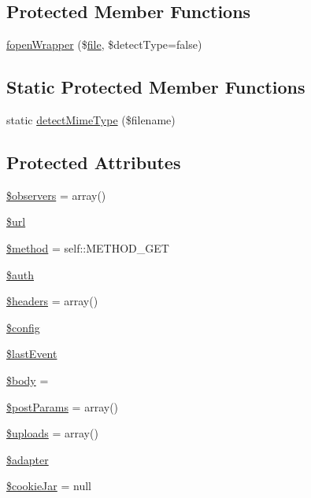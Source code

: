 \subsection*{Protected Member Functions}
\begin{DoxyCompactItemize}
\item 
\hyperlink{classHTTP__Request2_a1d4b42d63213562467f393e34c7a76dc}{fopen\+Wrapper} (\$\hyperlink{classfile}{file}, \$detect\+Type=false)
\end{DoxyCompactItemize}
\subsection*{Static Protected Member Functions}
\begin{DoxyCompactItemize}
\item 
static \hyperlink{classHTTP__Request2_ac1b8f0776d5faf41503d440350c8b6d6}{detect\+Mime\+Type} (\$filename)
\end{DoxyCompactItemize}
\subsection*{Protected Attributes}
\begin{DoxyCompactItemize}
\item 
\hyperlink{classHTTP__Request2_ab57c87d4bee6cb35be6b976a8ec7ec2f}{\$observers} = array()
\item 
\hyperlink{classHTTP__Request2_acf16b4d76ebd04a80dc8e140303ad895}{\$url}
\item 
\hyperlink{classHTTP__Request2_ae83c79d14f1b596d91b60862ea1370af}{\$method} = self\+::\+M\+E\+T\+H\+O\+D\+\_\+\+G\+ET
\item 
\hyperlink{classHTTP__Request2_a4c1219356a8c669730a1fe09bd8f81b1}{\$auth}
\item 
\hyperlink{classHTTP__Request2_a0d70f1b39d77f1e8bca7cd984d25192e}{\$headers} = array()
\item 
\hyperlink{classHTTP__Request2_a4043f1c6f00d8b92d2b3dcb5ecd2861e}{\$config}
\item 
\hyperlink{classHTTP__Request2_a53a051d2cfcad3fc688b7974c996e750}{\$last\+Event}
\item 
\hyperlink{classHTTP__Request2_af7de92496442c98589954db8327f9faf}{\$body} = \textquotesingle{}\textquotesingle{}
\item 
\hyperlink{classHTTP__Request2_a77aa571439401e1cd2adc407f4bdc222}{\$post\+Params} = array()
\item 
\hyperlink{classHTTP__Request2_ad95bfff299ff890d4f554754428337e5}{\$uploads} = array()
\item 
\hyperlink{classHTTP__Request2_a4de3f606051b53b314179271f9bd0173}{\$adapter}
\item 
\hyperlink{classHTTP__Request2_a1a4f35074ef955bfe726e85b76ed17a9}{\$cookie\+Jar} = null
\end{DoxyCompactItemize}


